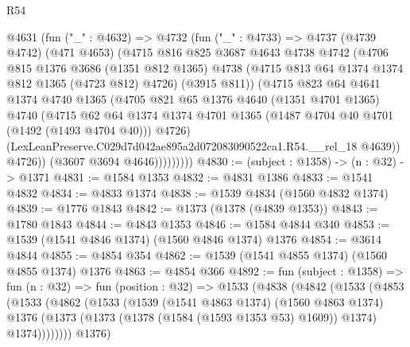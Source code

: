 \begin{lexlean}{R54}
\begin{coremodule}
              @4631
                (fun ("_" : @4632) =>
                @4732
                  (fun ("_" : @4733) =>
                  @4737
                    (@4739 @4742)
                    (@471 @4653)
                    (@4715
                      @816
                      @825
                      @3687
                      @4643
                      @4738
                      @4742
                      (@4706
                        @815
                        @1376
                        @3686
                        (@1351 @812 @1365)
                        @4738
                        (@4715 @813 @64 @1374 @1374 @812 @1365 (@4723 @812) @4726)
                        (@3915 @811))
                      (@4715
                        @823
                        @64
                        @4641
                        @1374
                        @4740
                        @1365
                        (@4705
                          @821
                          @65
                          @1376
                          @4640
                          (@1351 @4701 @1365)
                          @4740
                          (@4715
                            @62
                            @64
                            @1374
                            @1374
                            @4701
                            @1365
                            (@1487 @4704 @40 @4701 (@1492 (@1493 @4704 @40)))
                            @4726)
                          (LexLeanPreserve.C029d7d042ae895a2d072083090522ca1.R54.__rel_18 @4639))
                        @4726))
                    (@3607 @3694 @4646)))))))))
@4830 := (subject : @1358) -> (n : @32) -> @1371
@4831 := @1584 @1353
@4832 := @4831 @1386
@4833 := @1541 @4832
@4834 := @4833 @1374
@4838 := @1539 @4834 (@1560 @4832 @1374)
@4839 := @1776 @1843
@4842 := @1373 (@1378 (@4839 @1353))
@4843 := @1780 @1843
@4844 := @4843 @1353
@4846 := @1584 @4844 @340
@4853 := @1539 (@1541 @4846 @1374) (@1560 @4846 @1374) @1376
@4854 := @3614 @4844
@4855 := @4854 @354
@4862 := @1539 (@1541 @4855 @1374) (@1560 @4855 @1374) @1376
@4863 := @4854 @366
@4892 := fun (subject : @1358) =>
  fun (n : @32) =>
  fun (position : @32) =>
  @1533
    (@4838
      (@4842
        (@1533
          (@4853
            (@1533
              (@4862
                (@1533
                  (@1539
                    (@1541 @4863 @1374)
                    (@1560 @4863 @1374)
                    @1376
                    (@1373 (@1373 (@1378 (@1584 (@1593 @1353 @53) @1609)) @1374) @1374))))))))
      @1376)

\end{coremodule}
\end{lexlean}
